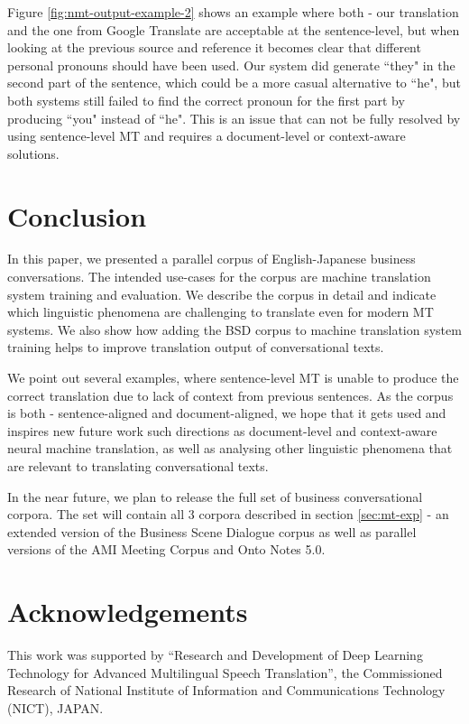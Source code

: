\documentclass[11pt,a4paper]{article}
\begin{document}
Figure \ref{fig:nmt-output-example-2} shows an example where both - our translation and the one from Google Translate are acceptable at the sentence-level, but when looking at the previous source and reference it becomes clear that different personal pronouns should have been used. Our system did generate ``they" in the second part of the sentence, which could be a more casual alternative to ``he", but both systems still failed to find the correct pronoun for the first part by producing ``you" instead of ``he". This is an issue that can not be fully resolved by using sentence-level MT and requires a document-level or context-aware solutions.

\section{Conclusion}
\label{sec:conclusion}
In this paper, we presented a parallel corpus of English-Japanese business conversations. The intended use-cases for the corpus are machine translation system training and evaluation. We describe the corpus in detail and indicate which linguistic phenomena are challenging to translate even for modern MT systems. We also show how adding the BSD corpus to machine translation system training helps to improve translation output of conversational texts.


We point out several examples, where sentence-level MT is unable to produce the correct translation due to lack of context from previous sentences. As the corpus is both - sentence-aligned and document-aligned, we hope that it gets used and inspires new future work such directions as document-level and context-aware neural machine translation, as well as analysing other linguistic phenomena that are relevant to translating conversational texts.

In the near future, we plan to release the full set of business conversational corpora. The set will contain all 3 corpora described in section \ref{sec:mt-exp} - an extended version of the Business Scene Dialogue corpus as well as parallel versions of the AMI Meeting Corpus and Onto Notes 5.0.

\section*{Acknowledgements}

This work was supported by “Research and Development of Deep Learning Technology for Advanced Multilingual Speech Translation”, the Commissioned Research of National Institute of Information and Communications Technology (NICT), JAPAN.



\end{document}

